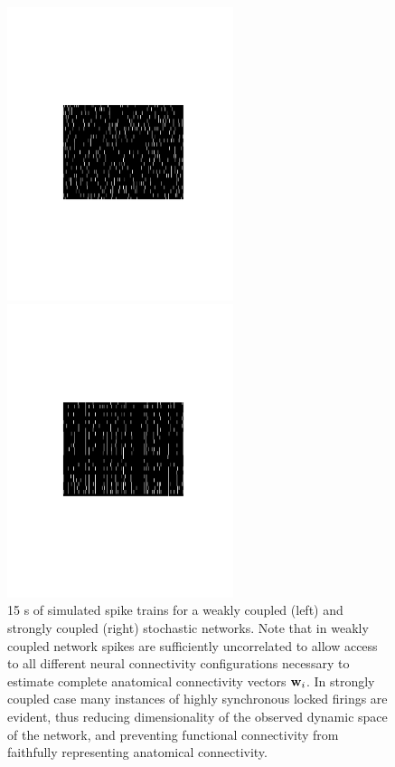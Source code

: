 \documentclass[amsmath,amssymb]{revtex4}
\begin{document}
\begin{figure}
\centering
\begin{minipage}[c]{0.45\hsize}
\includegraphics[width=250px]{Figure7b_raster_weak}
\end{minipage}
\begin{minipage}[c]{0.45\hsize}
\includegraphics[width=250px]{Figure7a_raster_strong}
\end{minipage}
\caption{15 s of simulated spike trains for a weakly coupled (left)
and strongly coupled (right) stochastic networks. Note that in weakly coupled network spikes are sufficiently uncorrelated to allow access to all different neural connectivity configurations necessary to estimate complete anatomical connectivity vectors ${\bf w}_i$. In strongly coupled case many instances of highly synchronous locked firings are evident, thus reducing dimensionality of the observed dynamic space of the network, and preventing functional connectivity from faithfully representing anatomical connectivity.}
\label{fig:rasters}
\end{figure}
\end{document}

